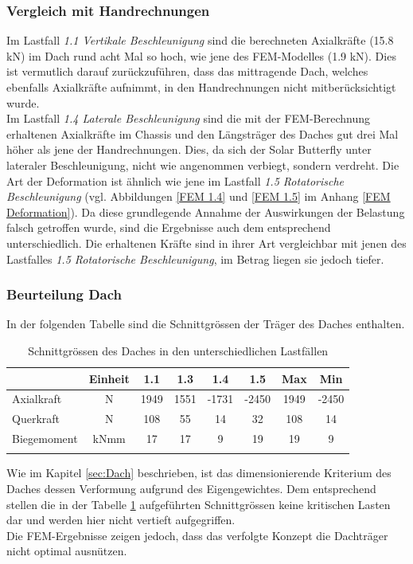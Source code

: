 \subsubsection{Vergleich mit Handrechnungen}
Im Lastfall \emph{1.1 Vertikale Beschleunigung} sind die berechneten Axialkräfte (15.8 kN) im Dach rund acht Mal so hoch, wie jene des FEM-Modelles (1.9 kN). Dies ist vermutlich darauf zurückzuführen, dass das mittragende Dach, welches ebenfalls Axialkräfte aufnimmt, in den Handrechnungen nicht mitberücksichtigt wurde.\\
Im Lastfall \emph{1.4 Laterale Beschleunigung} sind die mit der FEM-Berechnung erhaltenen Axialkräfte im Chassis und den Längsträger des Daches gut drei Mal höher als jene der Handrechnungen. Dies, da sich der Solar Butterfly unter lateraler Beschleunigung, nicht wie angenommen verbiegt, sondern verdreht. Die Art der Deformation ist ähnlich wie jene im Lastfall \emph{1.5 Rotatorische Beschleunigung} (vgl. Abbildungen \ref{FEM 1.4} und \ref{FEM 1.5} im Anhang \ref{FEM Deformation}). Da diese grundlegende Annahme der Auswirkungen der Belastung falsch getroffen wurde, sind die Ergebnisse auch dem entsprechend unterschiedlich. Die erhaltenen Kräfte sind in ihrer Art vergleichbar mit jenen des Lastfalles \emph{1.5 Rotatorische Beschleunigung}, im Betrag liegen sie jedoch tiefer.\\

\subsubsection{Beurteilung Dach}
In der folgenden Tabelle sind die Schnittgrössen der Träger des Daches enthalten.

\begin{table}[H]
\centering
\begin{tabular}{lccccccc}
\thickhline
  &	Einheit	&	1.1	&	1.3	&	1.4	&	1.5	&	Max	&	Min	\\	\hline
Axialkraft	&	N	&	1949	&	1551	&	-1731	&	-2450	&	1949	&	-2450	\\
Querkraft	&	N	&	108	&	55	&	14	&	32	&	108	&	14	\\
Biegemoment	&	kNmm	&	17	&	17	&	9	&	19	&	19	&	9	\\	\thickhline
\end{tabular}
\caption{Schnittgrössen des Daches in den unterschiedlichen Lastfällen}
\label{tab:FEMres Dach}
\end{table}


Wie im Kapitel \ref{sec:Dach} beschrieben, ist das dimensionierende Kriterium des Daches dessen Verformung aufgrund des Eigengewichtes. Dem entsprechend stellen die in der Tabelle \ref{tab:FEMres Dach} aufgeführten Schnittgrössen keine kritischen Lasten dar und werden hier nicht vertieft aufgegriffen.\\
Die FEM-Ergebnisse zeigen jedoch, dass das verfolgte Konzept die Dachträger nicht optimal ausnützen.

